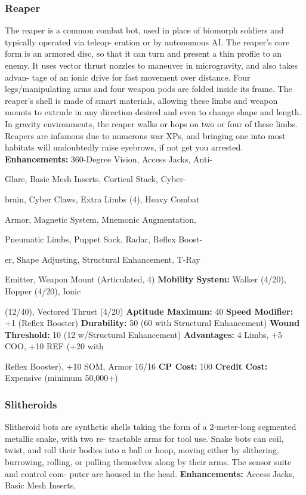 \subsubsection{Reaper}

The reaper is a common combat bot, used in place of 
biomorph soldiers and typically operated via teleop-
eration or by autonomous AI. The reaper's core form 
is an armored disc, so that it can turn and present a 
thin profile to an enemy. It uses vector thrust nozzles 
to maneuver in microgravity, and also takes advan-
tage of an ionic drive for fast movement over distance. 
Four legs/manipulating arms and four weapon pods 
are folded inside its frame. The reaper's shell is made 
of smart materials, allowing these limbs and weapon 
mounts to extrude in any direction desired and even 
to change shape and length. In gravity environments, 
the reaper walks or hops on two or four of these limbs. 
Reapers are infamous due to numerous war XPs, and 
bringing one into most habitats will undoubtedly raise 
eyebrows, if not get you arrested.
\textbf{Enhancements:} 360-Degree Vision, Access Jacks, Anti-

Glare, Basic Mesh Inserts, Cortical Stack, Cyber-

brain, Cyber Claws, Extra Limbs (4), Heavy Combat 

Armor, Magnetic System, Mnemonic Augmentation, 

Pneumatic Limbs, Puppet Sock, Radar, Reflex Boost-

er, Shape Adjusting, Structural Enhancement, T-Ray 

Emitter, Weapon Mount (Articulated, 4)
\textbf{Mobility System:} Walker (4/20), Hopper (4/20), Ionic 

(12/40), Vectored Thrust (4/20)
\textbf{Aptitude Maximum: }40
\textbf{Speed Modifier: }+1 (Reflex Booster)
\textbf{Durability:} 50 (60 with Structural Enhancement)
\textbf{Wound Threshold: }10 (12 w/Structural Enhancement)
\textbf{Advantages: }4 Limbs, +5 COO, +10 REF (+20 with 

Reflex Booster), +10 SOM, Armor 16/16
\textbf{CP Cost: }100
\textbf{Credit Cost: }Expensive (minimum 50,000+)

\subsubsection{Slitheroids}

Slitheroid bots are synthetic shells taking the form of 
a 2-meter-long segmented metallic snake, with two re-
tractable arms for tool use. Snake bots can coil, twist, 
and roll their bodies into a ball or hoop, moving either 
by slithering, burrowing, rolling, or pulling themselves 
along by their arms. The sensor suite and control com-
puter are housed in the head.
\textbf{Enhancements:} Access Jacks, Basic Mesh Inserts, 

